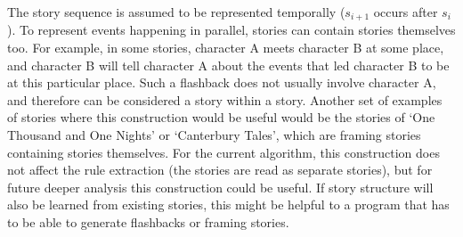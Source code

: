 The story sequence is assumed to be represented temporally ($s_{i+1}$ occurs
after $s_i$). To represent events happening in parallel, stories can contain
stories themselves too. For example, in some stories, character A meets
character B at some place, and character B will tell character A about the
events that led character B to be at this particular place. Such a flashback
does not usually involve character A, and therefore can be considered a story within a
story. Another set of examples of stories where this construction would be
useful would be the stories of `One Thousand and One Nights' or `Canterbury Tales',
which are framing stories containing stories themselves. For the current algorithm, this construction does not
affect the rule extraction (the stories are read as separate stories), 
but for future deeper analysis this construction could be useful. If story
structure will also be learned from existing stories, this might be helpful to a
program that has to be able to generate flashbacks or framing stories.

